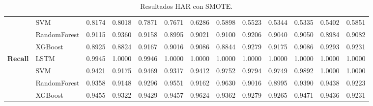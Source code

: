 \begin{table}[h]
\begin{adjustbox}{max width=15cm}
\begin{tabular}{|c|l|r|r|r|r|r|r|r|r|r|r|r|}
			& SVM &  0.8174 &  0.8018 &  0.7871 &  0.7671 &  0.6286 &  0.5898 &  0.5523 &  0.5344 &  0.5335 &  0.5402 &  0.5851 \\
			& RandomForest &  0.9115 &  0.9360 &  0.9158 &  0.8995 &  0.9021 &  0.9100 &  0.9206 &  0.9040 &  0.9050 &  0.8984 &  0.9082 \\
			& XGBoost &  0.8925 &  0.8824 &  0.9167 &  0.9016 &  0.9086 &  0.8844 &  0.9279 &  0.9175 &  0.9086 &  0.9293 &  0.9231 \\
			\hline
			\textbf{Recall} & LSTM &  0.9945 &  1.0000 &  0.9946 &  1.0000 &  1.0000 &  1.0000 &  1.0000 &  1.0000 &  1.0000 &  1.0000 &  1.0000 \\
			& SVM &  0.9421 &  0.9175 &  0.9469 &  0.9317 &  0.9412 &  0.9752 &  0.9794 &  0.9749 &  0.9892 &  1.0000 &  1.0000 \\
			& RandomForest &  0.9358 &  0.9148 &  0.9296 &  0.9551 &  0.9162 &  0.9630 &  0.9016 &  0.8995 &  0.9390 &  0.9438 &  0.9223 \\
			& XGBoost &  0.9455 &  0.9322 &  0.9429 &  0.9457 &  0.9624 &  0.9362 &  0.9279 &  0.9265 &  0.9471 &  0.9436 &  0.9231 \\
			\hline
		\end{tabular}
	\end{adjustbox}
	\caption{Resultados HAR con SMOTE.}
	\label{tab:HAR_SMOTE}
\end{table}
\newpage
